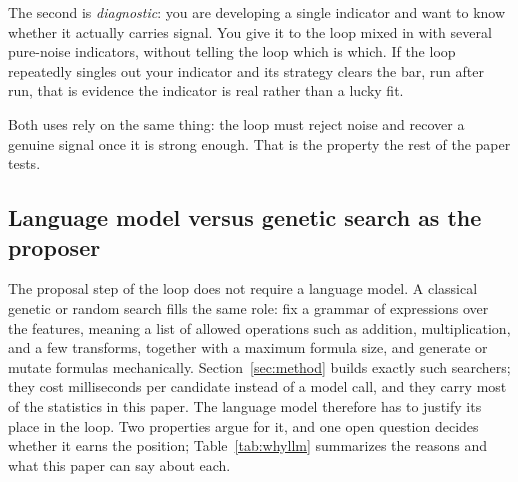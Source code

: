 \documentclass[11pt]{article}
\begin{document}
The second is \emph{diagnostic}: you are developing a single indicator and want to know whether it
actually carries signal. You give it to the loop mixed in with several pure-noise indicators, without
telling the loop which is which. If the loop repeatedly singles out your indicator and its strategy clears
the bar, run after run, that is evidence the indicator is real rather than a lucky fit.

Both uses rely on the same thing: the loop must reject noise and recover a genuine signal once it is
strong enough. That is the property the rest of the paper tests.

\subsection{Language model versus genetic search as the proposer}
\label{sec:whyllm}

The proposal step of the loop does not require a language model. A classical genetic or random search
fills the same role: fix a grammar of expressions over the features, meaning a list of allowed
operations such as addition, multiplication, and a few transforms, together with a maximum formula
size, and generate or mutate formulas mechanically. Section~\ref{sec:method} builds exactly such
searchers; they cost milliseconds per candidate instead of a model call, and they carry most of the
statistics in this paper. The language model therefore has to justify its place in the loop. Two
properties argue for it, and one open question decides whether it earns the position;
Table~\ref{tab:whyllm} summarizes the reasons and what this paper can say about each.
\end{document}
